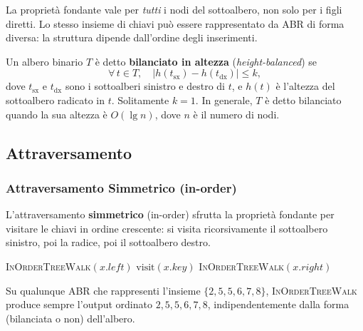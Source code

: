\begin{hardnote}
	La proprietà fondante vale per \emph{tutti} i nodi del sottoalbero, non solo per i figli
	diretti. Lo stesso insieme di chiavi può essere rappresentato da ABR di forma diversa:
	la struttura dipende dall'ordine degli inserimenti.
\end{hardnote}

\begin{definizione}
	Un albero binario $T$ è detto \textbf{bilanciato in altezza} (\emph{height-balanced}) se
	\[
	\forall\, t \in T,\quad \bigl|h(t_{\mathrm{sx}}) - h(t_{\mathrm{dx}})\bigr| \leq k,
	\]
	dove $t_{\mathrm{sx}}$ e $t_{\mathrm{dx}}$ sono i sottoalberi sinistro e destro di $t$,
	e $h(t)$ è l'altezza del sottoalbero radicato in $t$. Solitamente $k = 1$.
	In generale, $T$ è detto bilanciato quando la sua altezza è $O(\lg n)$,
	dove $n$ è il numero di nodi.
\end{definizione}

\subsection{Attraversamento}
\label{sub:abr_attraversamento}

\subsubsection{Attraversamento Simmetrico (in-order)}
\label{subsub:inorder}

\begin{softnote}
	L'attraversamento \textbf{simmetrico} (in-order) sfrutta la proprietà fondante per
	visitare le chiavi in ordine crescente: si visita ricorsivamente il sottoalbero sinistro,
	poi la radice, poi il sottoalbero destro.
\end{softnote}

\begin{algorithm}[H]
	\caption{\textsc{InOrderTreeWalk}$(x)$}
	\textsc{InOrderTreeWalk}$(x.\mathit{left})$\;
	$\mathrm{visit}(x.\mathit{key})$ 
	\textsc{InOrderTreeWalk}$(x.\mathit{right})$\;
\end{algorithm}

\begin{nota}
	Su qualunque ABR che rappresenti l'insieme $\{2,5,5,6,7,8\}$,
	\textsc{InOrderTreeWalk} produce sempre l'output ordinato $2,5,5,6,7,8$,
	indipendentemente dalla forma (bilanciata o non) dell'albero.
\end{nota}

